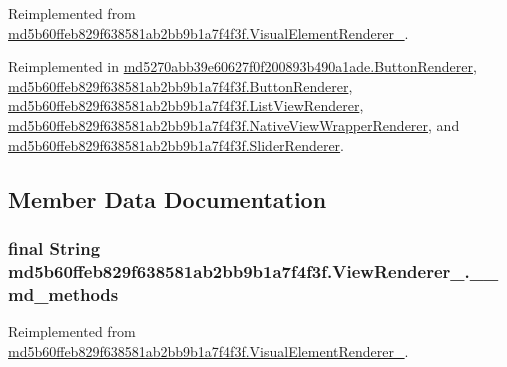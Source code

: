 Reimplemented from \hyperlink{classmd5b60ffeb829f638581ab2bb9b1a7f4f3f_1_1_visual_element_renderer__1_8c7af843aeec04827cb3a3981ea1978d}{md5b60ffeb829f638581ab2bb9b1a7f4f3f.VisualElementRenderer\_}.

Reimplemented in \hyperlink{classmd5270abb39e60627f0f200893b490a1ade_1_1_button_renderer_f2e3875cd2b7a03f7278f91e55939532}{md5270abb39e60627f0f200893b490a1ade.ButtonRenderer}, \hyperlink{classmd5b60ffeb829f638581ab2bb9b1a7f4f3f_1_1_button_renderer_32dc12b457387df026545663655ce4b2}{md5b60ffeb829f638581ab2bb9b1a7f4f3f.ButtonRenderer}, \hyperlink{classmd5b60ffeb829f638581ab2bb9b1a7f4f3f_1_1_list_view_renderer_aab562eda2712d67615715b8aa3d00c7}{md5b60ffeb829f638581ab2bb9b1a7f4f3f.ListViewRenderer}, \hyperlink{classmd5b60ffeb829f638581ab2bb9b1a7f4f3f_1_1_native_view_wrapper_renderer_428463947529e7fd1d164b52f9d54d56}{md5b60ffeb829f638581ab2bb9b1a7f4f3f.NativeViewWrapperRenderer}, and \hyperlink{classmd5b60ffeb829f638581ab2bb9b1a7f4f3f_1_1_slider_renderer_fac38e4eaa408c22962aa4a88025b986}{md5b60ffeb829f638581ab2bb9b1a7f4f3f.SliderRenderer}.

\subsection{Member Data Documentation}
\hypertarget{classmd5b60ffeb829f638581ab2bb9b1a7f4f3f_1_1_view_renderer__2_80b609e3e4054c380887d4dc2907a875}{
\subsubsection[{\_\-\_\-md\_\-methods}]{\setlength{\rightskip}{0pt plus 5cm}final String {\bf md5b60ffeb829f638581ab2bb9b1a7f4f3f.ViewRenderer\_.\_\-\_\-md\_\-methods}}}
\label{classmd5b60ffeb829f638581ab2bb9b1a7f4f3f_1_1_view_renderer__2_80b609e3e4054c380887d4dc2907a875}




Reimplemented from \hyperlink{classmd5b60ffeb829f638581ab2bb9b1a7f4f3f_1_1_visual_element_renderer__1_4ef182bc984a4330ed789e1f0b0222d1}{md5b60ffeb829f638581ab2bb9b1a7f4f3f.VisualElementRenderer\_}.

